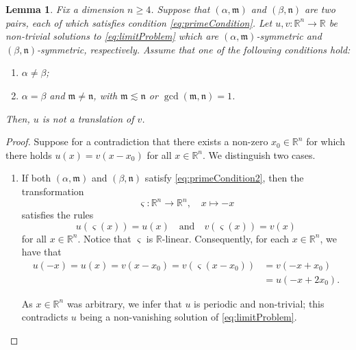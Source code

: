 \documentclass[10pt, reqno]{amsart}
\newcommand{\RR}{\mathbb{R}}
\newcommand{\m}{\mathfrak{m}}
\newcommand{\n}{\mathfrak{n}}
\numberwithin{equation}{section}
\theoremstyle{definition}
\theoremstyle{remark}
\theoremstyle{plain}
\newtheorem{lem}[prop]{Lemma}
\begin{document}
	\begin{lem}\label{lem:noTranslation}
		Fix a dimension $n \ge 4$. Suppose that $(\alpha, \m)$ and $(\beta, \n)$ are two pairs, each of which satisfies condition \eqref{eq:primeCondition}. Let $u,v : \RR^n \to \RR$ be non-trivial solutions to \eqref{eq:limitProblem} which are $(\alpha,\m)$-symmetric and $(\beta,\n)$-symmetric, respectively. Assume that one of the following conditions hold: 
		\begin{enumerate}
			\item $\alpha \ne \beta$;
			\item $\alpha = \beta$ and $\m \ne \n$, with $\m \lesssim \n$ or $\gcd(\m,\n) = 1$.
		\end{enumerate}
		Then, $u$ is not a translation of $v$. 
	\end{lem}
	\begin{proof}
		Suppose for a contradiction that there exists a non-zero $x_0 \in \RR^n$ for which there holds $u(x) = v(x-x_0)$ for all $x \in \RR^n$. We distinguish two cases.
		\begin{enumerate}
			\item If both $(\alpha,\m)$ and $(\beta,\n)$ satisfy \eqref{eq:primeCondition2}, then the transformation 
			\[
			\varsigma : \RR^n \to \RR^n, \quad x \mapsto -x
			\]
			satisfies the rules
			\[
			u(\varsigma (x)) = u(x) \quad \text{and} \quad v(\varsigma (x)) = v(x)
			\]
			for all $x \in \RR^n$. Notice that $\varsigma$ is $\RR$-linear. Consequently, for each $x \in \RR^n$, we have that
			\begin{align*}
				u(-x) = u(x) = v(x-x_0) = v(\varsigma (x-x_0) ) &= v(-x + x_0)\\
				&=u(-x+2x_0).
			\end{align*}

			As $x \in \RR^n$ was arbitrary, we infer that $u$ is periodic and non-trivial; this contradicts $u$ being a non-vanishing solution of \eqref{eq:limitProblem}.
			

\end{enumerate}
\end{proof}
\end{document}
